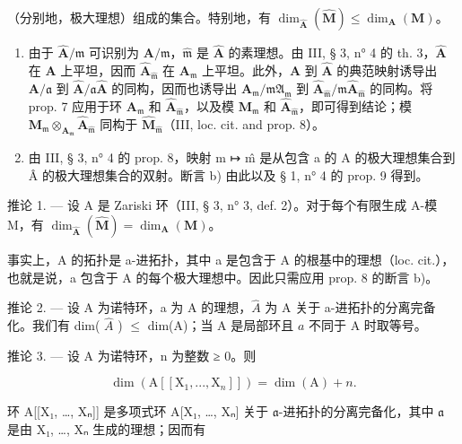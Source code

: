 （分别地，极大理想）组成的集合。特别地，有 \(\dim_{\hat{\mathbf{A}}}(\hat{\mathbf{M}}) \leqslant \dim_{\mathbf{A}}(\mathbf{M})\)。

\begin{enumerate}
\def\labelenumi{\alph{enumi})}
\item
  由于 \(\hat{\mathbf{A}}/\hat{\mathfrak{m}}\) 可识别为 \(\mathbf{A}/\mathfrak{m}\)，\(\hat{\mathfrak{m}}\) 是 \(\hat{\mathbf{A}}\) 的素理想。由 III, § 3, n° 4 的 th. 3，\(\hat{\mathbf{A}}\) 在 \(\mathbf{A}\) 上平坦，因而 \(\hat{\mathbf{A}}_{\hat{\mathfrak{m}}}\) 在 \(\mathbf{A}_{\mathfrak{m}}\) 上平坦。此外，\(\mathbf{A}\) 到 \(\hat{\mathbf{A}}\) 的典范映射诱导出 \(\mathbf{A}/\mathfrak{a}\) 到 \(\hat{\mathbf{A}}/\mathfrak{a}\hat{\mathbf{A}}\) 的同构，因而也诱导出 \(\mathbf{A}_{\mathfrak{m}}/\mathfrak{mA}_{\mathfrak{m}}\) 到 \(\hat{\mathbf{A}}_{\hat{\mathfrak{m}}}/\mathfrak{m}\hat{\mathbf{A}}_{\hat{\mathfrak{m}}}\) 的同构。将 prop. 7 应用于环 \(\mathbf{A}_{\mathfrak{m}}\) 和 \(\hat{\mathbf{A}}_{\hat{\mathfrak{m}}}\)，以及模 \(\mathbf{M}_{\mathfrak{m}}\) 和 \(\hat{\mathbf{A}}_{\hat{\mathfrak{m}}}\)，即可得到结论；模 \(\mathbf{M}_{\mathfrak{m}} \otimes_{\mathbf{A}_{\mathfrak{m}}} \hat{\mathbf{A}}_{\hat{\mathfrak{m}}}\) 同构于 \(\hat{\mathbf{M}}_{\hat{\mathfrak{m}}}\)（III, loc. cit. and prop. 8）。
\item
  由 III, § 3, n° 4 的 prop. 8，映射 m ↦ m̂ 是从包含 a 的 A 的极大理想集合到 Â 的极大理想集合的双射。断言 b) 由此以及 § 1, n° 4 的 prop. 9 得到。
\end{enumerate}

推论 1. --- 设 A 是 Zariski 环（III, § 3, n° 3, def. 2）。对于每个有限生成 A-模 M，有 \(\dim_{\hat{\mathbf{A}}}(\hat{\mathbf{M}}) = \dim_{\mathbf{A}}(\mathbf{M})\)。

事实上，A 的拓扑是 a-进拓扑，其中 a 是包含于 A 的根基中的理想（loc. cit.），也就是说，a 包含于 A 的每个极大理想中。因此只需应用 prop. 8 的断言 b)。

推论 2. --- 设 A 为诺特环，a 为 A 的理想，\(\hat{A}\) 为 A 关于 a-进拓扑的分离完备化。我们有 dim( \(\hat{A}\) ) \(\leqslant\) dim(A)；当 A 是局部环且 \(a\) 不同于 A 时取等号。

推论 3. --- 设 A 为诺特环，n 为整数 ≥ 0。则

\[
\dim (\mathrm{A} [ [ \mathrm{X} _ {1},..., \mathrm{X} _ {n} ] ]) = \dim (\mathrm{A}) + n.
\]

环 A{[}{[}X₁, \ldots, Xₙ{]}{]} 是多项式环 A{[}X₁, \ldots, Xₙ{]} 关于 \(\mathfrak{a}\)-进拓扑的分离完备化，其中 \(\mathfrak{a}\) 是由 X₁, \ldots, Xₙ 生成的理想；因而有


